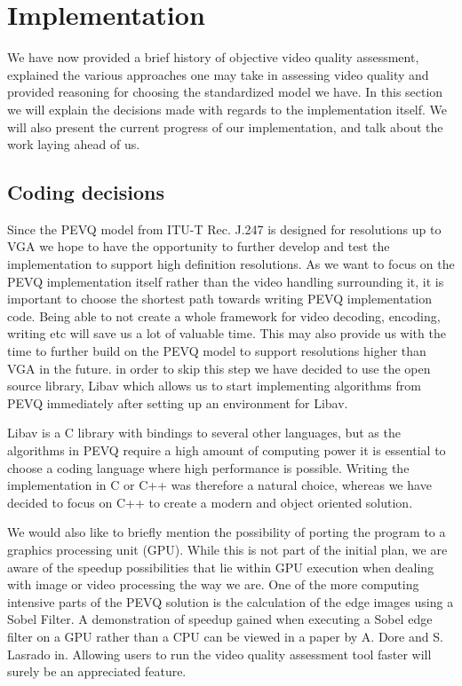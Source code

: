 \section{Implementation}\label{sect:implementation}
We have now provided a brief history of objective video quality assessment, explained the various approaches one may take in assessing video quality and provided reasoning for choosing the standardized model we have. In this section we will explain the decisions made with regards to the implementation itself. We will also present the current progress of our implementation, and talk about the work laying ahead of us.

\subsection{Coding decisions}\label{sect:coding}
Since the PEVQ model from ITU-T Rec. J.247 is designed for resolutions up to VGA we hope to have the opportunity to further develop and test the implementation to support high definition resolutions. 
As we want to focus on the PEVQ implementation itself rather than the video handling surrounding it, it is important to choose the shortest path towards writing PEVQ implementation code. Being able to not create a whole framework for video decoding, encoding, writing etc will save us a lot of valuable time. This may also provide us with the time to further build on the PEVQ model to support resolutions higher than VGA in the future. in order to skip this step we have decided to use the open source library, Libav\cite{libav} which allows us to start implementing algorithms from PEVQ immediately after setting up an environment for Libav.

Libav is a C library with bindings to several other languages, but as the algorithms in PEVQ require a high amount of computing power it is essential to choose a coding language where high performance is possible. Writing the implementation in C or C++ was therefore a natural choice, whereas we have decided to focus on C++ to create a modern and object oriented solution.

We would also like to briefly mention the possibility of porting the program to a graphics processing unit (GPU). While this is not part of the initial plan, we are aware of the speedup possibilities that lie within GPU execution when dealing with image or video processing the way we are. One of the more computing intensive parts of the PEVQ solution is the calculation of the edge images using a Sobel Filter. A demonstration of speedup gained when executing a Sobel edge filter on a GPU rather than a CPU can be viewed in a paper by A. Dore and S. Lasrado in\cite{sobelFilterGPU}. Allowing users to run the video quality assessment tool faster will surely be an appreciated feature.


